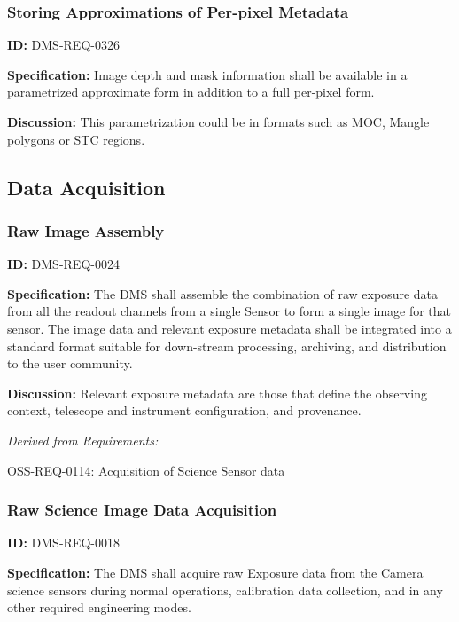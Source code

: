 \documentclass[SE,toc,lsstdraft]{lsstdoc}
\begin{document}
\subsubsection{Storing Approximations of Per-pixel Metadata}

\label{DMS-REQ-0326}
\textbf{ID:} DMS-REQ-0326

\textbf{Specification:} Image depth and mask information shall be available in a parametrized approximate form in addition to a full per-pixel form.

\textbf{Discussion:} This parametrization could be in formats such as MOC, Mangle polygons or STC regions.





\subsection{Data Acquisition}





\subsubsection{Raw Image Assembly}

\label{DMS-REQ-0024}
\textbf{ID:} DMS-REQ-0024

\textbf{Specification:} The DMS shall assemble the combination of raw exposure data from all the readout channels from a single Sensor to form a single image for that sensor. The image data and relevant exposure metadata shall be integrated into a standard format suitable for down-stream processing, archiving, and distribution to the user community.

\textbf{Discussion:} Relevant exposure metadata are those that define the observing context, telescope and instrument configuration, and provenance.




\emph{Derived from Requirements:}

OSS-REQ-0114:
Acquisition of Science Sensor data \newline


\subsubsection{Raw Science Image Data Acquisition}

\label{DMS-REQ-0018}
\textbf{ID:} DMS-REQ-0018

\textbf{Specification:} The DMS shall acquire raw Exposure data from the Camera science sensors during normal operations, calibration data collection, and in any other required engineering modes.
\end{document}
